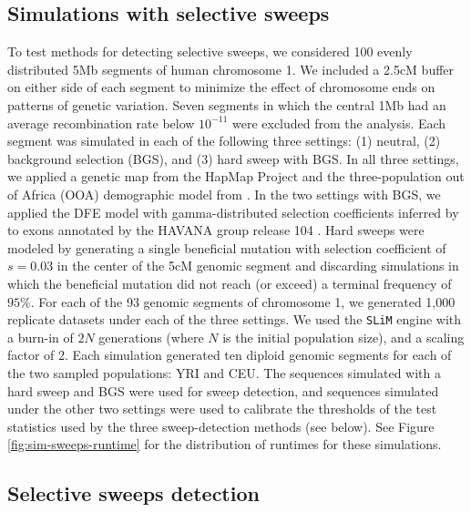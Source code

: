 \documentclass[hidelinks]{article}
\newcommand{\stdpopsim}{\texttt{stdpopsim}\xspace}
\newcommand{\slim}{\texttt{SLiM}\xspace}
\begin{document}
    \subsection*{Simulations with selective sweeps}

    To test methods for detecting selective sweeps, we considered 100 evenly distributed 5Mb
    segments of human chromosome 1.
    We included a 2.5cM buffer on either side of each segment to minimize the effect of chromosome ends on patterns of genetic variation.
    Seven segments in which the central 1Mb had an average recombination rate below $10^{-11}$ were excluded from the analysis.
    Each segment was simulated in each of the following three settings:
    (1) neutral, (2) background selection (BGS), and (3) hard sweep with BGS.
    In all three settings, we applied a genetic map from the HapMap Project
    \citep[\stdpopsim label \texttt{HapMapII\_GRCh38}]{international2007second} and
    the three-population out of Africa (OOA) demographic model from
    \citet[\stdpopsim label \texttt{OutOfAfrica\_3G09}]{gutenkunst2009inferring}.
    In the two settings with BGS, we applied the DFE model with gamma-distributed selection coefficients inferred by
    \citet[\stdpopsim label \texttt{Gamma\_K17}]{kim2017inference} to exons annotated by the HAVANA group release 104
    \citep[\stdpopsim label \texttt{ensembl\_havana\_104\_exons}]{ensembl2018}.
    Hard sweeps were modeled by generating a single beneficial mutation
    with selection coefficient of $s = 0.03$ in the center of the 5cM genomic segment
    and discarding simulations in which the beneficial mutation did not reach (or exceed) a terminal frequency of $95\%$.
    For each of the 93 genomic segments of chromosome 1, we generated 1,000 replicate datasets under each of the three settings.
    We used the \slim engine with a burn-in of $2N$ generations
    (where $N$ is the initial population size), and a scaling factor of 2.
    Each simulation generated ten diploid genomic segments for each of the two sampled populations: YRI and CEU.
    The sequences simulated with a hard sweep and BGS were used for sweep detection,
    and sequences simulated under the other two settings were used to calibrate the thresholds of the test statistics
    used by the three sweep-detection methods (see below).
    See Figure \ref{fig:sim-sweeps-runtime} for the distribution of runtimes for these simulations. 

    \subsection*{Selective sweeps detection}
\end{document}
